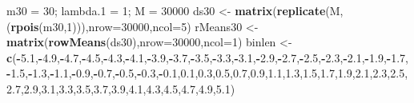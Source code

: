 \documentclass[
]{article}
\newenvironment{Shaded}{\begin{snugshade}}{\end{snugshade}}
\newcommand{\DataTypeTok}[1]{\textcolor[rgb]{0.13,0.29,0.53}{#1}}
\newcommand{\DecValTok}[1]{\textcolor[rgb]{0.00,0.00,0.81}{#1}}
\newcommand{\FloatTok}[1]{\textcolor[rgb]{0.00,0.00,0.81}{#1}}
\newcommand{\KeywordTok}[1]{\textcolor[rgb]{0.13,0.29,0.53}{\textbf{#1}}}
\newcommand{\NormalTok}[1]{#1}
\newcommand{\OperatorTok}[1]{\textcolor[rgb]{0.81,0.36,0.00}{\textbf{#1}}}
\newcommand{\StringTok}[1]{\textcolor[rgb]{0.31,0.60,0.02}{#1}}
\begin{document}
\begin{Shaded}
\begin{Highlighting}[]
\NormalTok{m30 =}\StringTok{ }\DecValTok{30}\NormalTok{; lambda}\FloatTok{.1}\NormalTok{ =}\StringTok{ }\DecValTok{1}\NormalTok{; M =}\StringTok{ }\DecValTok{30000}
\NormalTok{ds30 <-}\StringTok{ }\KeywordTok{matrix}\NormalTok{(}\KeywordTok{replicate}\NormalTok{(M,(}\KeywordTok{rpois}\NormalTok{(m30,}\DecValTok{1}\NormalTok{))),}\DataTypeTok{nrow=}\DecValTok{30000}\NormalTok{,}\DataTypeTok{ncol=}\DecValTok{5}\NormalTok{)}
\NormalTok{rMeans30 <-}\StringTok{ }\KeywordTok{matrix}\NormalTok{(}\KeywordTok{rowMeans}\NormalTok{(ds30),}\DataTypeTok{nrow=}\DecValTok{30000}\NormalTok{,}\DataTypeTok{ncol=}\DecValTok{1}\NormalTok{)}
\NormalTok{binlen <-}\StringTok{ }\KeywordTok{c}\NormalTok{(}\OperatorTok{-}\FloatTok{5.1}\NormalTok{,}\OperatorTok{-}\FloatTok{4.9}\NormalTok{,}\OperatorTok{-}\FloatTok{4.7}\NormalTok{,}\OperatorTok{-}\FloatTok{4.5}\NormalTok{,}\OperatorTok{-}\FloatTok{4.3}\NormalTok{,}\OperatorTok{-}\FloatTok{4.1}\NormalTok{,}\OperatorTok{-}\FloatTok{3.9}\NormalTok{,}\OperatorTok{-}\FloatTok{3.7}\NormalTok{,}\OperatorTok{-}\FloatTok{3.5}\NormalTok{,}\OperatorTok{-}\FloatTok{3.3}\NormalTok{,}\OperatorTok{-}\FloatTok{3.1}\NormalTok{,}\OperatorTok{-}\FloatTok{2.9}\NormalTok{,}\OperatorTok{-}\FloatTok{2.7}\NormalTok{,}\OperatorTok{-}\FloatTok{2.5}\NormalTok{,}\OperatorTok{-}\FloatTok{2.3}\NormalTok{,}\OperatorTok{-}\FloatTok{2.1}\NormalTok{,}\OperatorTok{-}\FloatTok{1.9}\NormalTok{,}\OperatorTok{-}\FloatTok{1.7}\NormalTok{,}\OperatorTok{-}\FloatTok{1.5}\NormalTok{,}\OperatorTok{-}\FloatTok{1.3}\NormalTok{,}\OperatorTok{-}\FloatTok{1.1}\NormalTok{,}\OperatorTok{-}\FloatTok{0.9}\NormalTok{,}\OperatorTok{-}\FloatTok{0.7}\NormalTok{,}\OperatorTok{-}\FloatTok{0.5}\NormalTok{,}\OperatorTok{-}\FloatTok{0.3}\NormalTok{,}\OperatorTok{-}\FloatTok{0.1}\NormalTok{,}\FloatTok{0.1}\NormalTok{,}\FloatTok{0.3}\NormalTok{,}\FloatTok{0.5}\NormalTok{,}\FloatTok{0.7}\NormalTok{,}\FloatTok{0.9}\NormalTok{,}\FloatTok{1.1}\NormalTok{,}\FloatTok{1.3}\NormalTok{,}\FloatTok{1.5}\NormalTok{,}\FloatTok{1.7}\NormalTok{,}\FloatTok{1.9}\NormalTok{,}\FloatTok{2.1}\NormalTok{,}\FloatTok{2.3}\NormalTok{,}\FloatTok{2.5}\NormalTok{,}\FloatTok{2.7}\NormalTok{,}\FloatTok{2.9}\NormalTok{,}\FloatTok{3.1}\NormalTok{,}\FloatTok{3.3}\NormalTok{,}\FloatTok{3.5}\NormalTok{,}\FloatTok{3.7}\NormalTok{,}\FloatTok{3.9}\NormalTok{,}\FloatTok{4.1}\NormalTok{,}\FloatTok{4.3}\NormalTok{,}\FloatTok{4.5}\NormalTok{,}\FloatTok{4.7}\NormalTok{,}\FloatTok{4.9}\NormalTok{,}\FloatTok{5.1}\NormalTok{)}

\end{Highlighting}
\end{Shaded}
\end{document}
